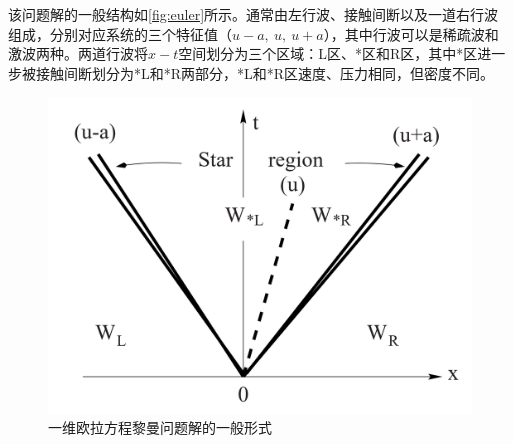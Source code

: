 \documentclass[11pt]{article}
\begin{document}
该问题解的一般结构如\autoref{fig:euler}所示。通常由左行波、接触间断以及一道右行波组成，分别对应系统的三个特征值（$u-a,\ u,\ u+a$），其中行波可以是稀疏波和激波两种。两道行波将$x-t$空间划分为三个区域：L区、*区和R区，其中*区进一步被接触间断划分为*L和*R两部分，*L和*R区速度、压力相同，但密度不同。
\begin{figure}[htbp]
	\centering
	\includegraphics[width=.4\linewidth]{figure/shocktube/euler.png}
	\caption{\label{fig:euler}一维欧拉方程黎曼问题解的一般形式}
\end{figure}
\end{document}
